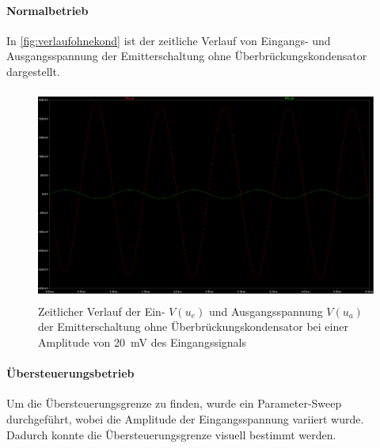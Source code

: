 \documentclass[12pt,english,ngerman]{scrartcl}
\begin{document}
\paragraph{Normalbetrieb}

In \autoref{fig:verlaufohnekond} ist der zeitliche Verlauf von Eingangs-
und Ausgangsspannung der Emitterschaltung ohne Überbrückungskondensator
dargestellt.

\begin{figure}[H]
    \centering
    \includegraphics[width=\linewidth, height=7cm]{./figures/ohnekond/eingangundausgangssignal.png}
    \caption{Zeitlicher Verlauf der Ein- $V(u_e)$ und Ausgangsspannung $V(u_a)$
    der Emitterschaltung ohne Überbrückungskondensator bei einer Amplitude von
    \SI{20}{mV} des Eingangssignals}
    \label{fig:verlaufohnekond}
\end{figure}


\paragraph{Übersteuerungsbetrieb}

Um die Übersteuerungsgrenze zu finden, wurde ein Parameter-Sweep durchgeführt,
wobei die Amplitude der Eingangsspannung variiert wurde. Dadurch konnte die
Übersteuerungsgrenze visuell bestimmt werden.



\end{document}
